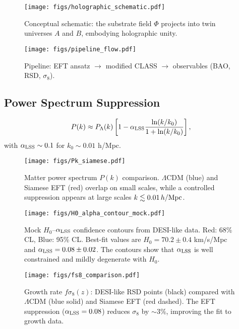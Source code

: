 \documentclass[11pt,a4paper]{article}
\begin{document}
\begin{figure}[h]
\centering
\texttt{[image: figs/holographic\_schematic.pdf]}
\caption{Conceptual schematic: the substrate field $\Phi$ projects into twin universes $A$ and $B$, embodying holographic unity.}
\label{fig:holographic}
\end{figure}

\begin{figure}[h]
\centering
\texttt{[image: figs/pipeline\_flow.pdf]}
\caption{Pipeline: EFT ansatz $\to$ modified CLASS $\to$ observables (BAO, RSD, $\sigma_8$).}
\label{fig:pipeline}
\end{figure}

\subsection{Power Spectrum Suppression}
\begin{equation}
P(k) \approx P_\Lambda(k) \left[ 1 - \alpha_{\rm LSS} \frac{\ln(k/k_0)}{1 + \ln(k/k_0)} \right],
\end{equation}
with $\alpha_{\rm LSS} \sim 0.1$ for $k_0 \sim 0.01$ h/Mpc.

\begin{figure}[h]
\centering
\texttt{[image: figs/Pk\_siamese.pdf]}
\caption{Matter power spectrum $P(k)$ comparison. $\Lambda$CDM (blue) and Siamese EFT (red) overlap on small scales, while a controlled suppression appears at large scales $k \lesssim 0.01\,h/{\rm Mpc}$.}
\label{fig:pk}
\end{figure}

\begin{figure}[h]
\centering
\texttt{[image: figs/H0\_alpha\_contour\_mock.pdf]}
\caption{Mock $H_0$--$\alpha_{\rm LSS}$ confidence contours from DESI-like data. Red: 68\% CL, Blue: 95\% CL. Best-fit values are $H_0=70.2\pm0.4$ km/s/Mpc and $\alpha_{\rm LSS}=0.08\pm0.02$. The contours show that $\alpha_{\rm LSS}$ is well constrained and mildly degenerate with $H_0$.}
\label{fig:H0alpha}
\end{figure}

\begin{figure}[h]
\centering
\texttt{[image: figs/fs8\_comparison.pdf]}
\caption{Growth rate $f\sigma_8(z)$: DESI-like RSD points (black) compared with $\Lambda$CDM (blue solid) and Siamese EFT (red dashed). The EFT suppression ($\alpha_{\rm LSS}=0.08$) reduces $\sigma_8$ by $\sim$3\%, improving the fit to growth data.}
\label{fig:fs8}
\end{figure}
\end{document}
